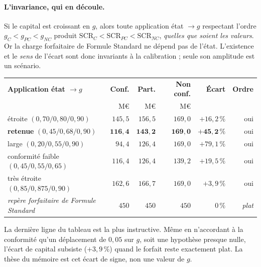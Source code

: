 \paragraph{L'invariance, qui en découle.} Si le capital est croissant en $g$, alors toute
application état $\to g$ respectant l'ordre $g_C < g_{PC} < g_{NC}$ produit
$\mathrm{SCR}_C < \mathrm{SCR}_{PC} < \mathrm{SCR}_{NC}$, \emph{quelles que soient les valeurs}.
Or la charge forfaitaire de Formule Standard ne dépend pas de l'état. L'existence et le
\emph{sens} de l'écart sont donc invariants à la calibration ; seule son amplitude
est un scénario.

\begin{center}\small
\renewcommand{\arraystretch}{1.25}
\begin{tabular}{@{}l r r r r r@{}}
\toprule
\textbf{Application état $\to g$} & \textbf{Conf.} & \textbf{Part.} & \textbf{Non conf.} &
\textbf{Écart} & \textbf{Ordre} \\
 & M\euro & M\euro & M\euro & & \\
\midrule
étroite $(0{,}70 / 0{,}80 / 0{,}90)$ & $145{,}5$ & $156{,}5$ & $169{,}0$ & $+16{,}2\,\%$ & oui \\
\textbf{retenue} $(0{,}45 / 0{,}68 / 0{,}90)$ & $\mathbf{116{,}4}$ & $\mathbf{143{,}2}$ &
$\mathbf{169{,}0}$ & $\mathbf{+45{,}2\,\%}$ & oui \\
large $(0{,}20 / 0{,}55 / 0{,}90)$ & $94{,}4$ & $126{,}4$ & $169{,}0$ & $+79{,}1\,\%$ & oui \\
conformité faible $(0{,}45 / 0{,}55 / 0{,}65)$ & $116{,}4$ & $126{,}4$ & $139{,}2$ &
$+19{,}5\,\%$ & oui \\
très étroite $(0{,}85 / 0{,}875 / 0{,}90)$ & $162{,}6$ & $166{,}7$ & $169{,}0$ & $+3{,}9\,\%$ &
oui \\
\midrule
\emph{repère forfaitaire de Formule Standard} & $450$ & $450$ & $450$ & $0\,\%$ & \emph{plat} \\
\bottomrule
\end{tabular}
\end{center}

\vspace{2pt}
La dernière ligne du tableau est la plus instructive. Même en n'accordant à la conformité qu'un
déplacement de $0{,}05$ sur $g$, soit une hypothèse presque nulle, l'écart de capital subsiste
($+3{,}9\,\%$) quand le forfait reste exactement plat. La thèse du mémoire est cet écart de signe, non une
valeur de $g$.

